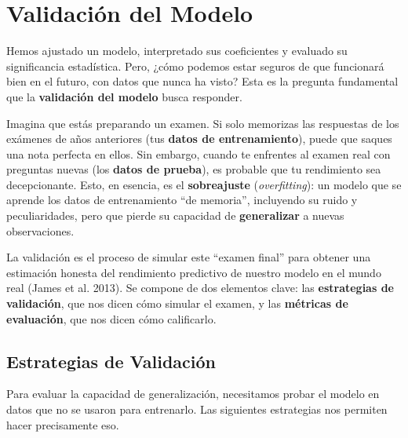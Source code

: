 \documentclass[
  letterpaper,
  DIV=11,
  numbers=noendperiod]{scrreprt}
\begin{document}
\section{Validación del Modelo}\label{validaciuxf3n-del-modelo}

Hemos ajustado un modelo, interpretado sus coeficientes y evaluado su
significancia estadística. Pero, ¿cómo podemos estar seguros de que
funcionará bien en el futuro, con datos que nunca ha visto? Esta es la
pregunta fundamental que la \textbf{validación del modelo} busca
responder.

Imagina que estás preparando un examen. Si solo memorizas las respuestas
de los exámenes de años anteriores (tus \textbf{datos de
entrenamiento}), puede que saques una nota perfecta en ellos. Sin
embargo, cuando te enfrentes al examen real con preguntas nuevas (los
\textbf{datos de prueba}), es probable que tu rendimiento sea
decepcionante. Esto, en esencia, es el \textbf{sobreajuste}
(\emph{overfitting}): un modelo que se aprende los datos de
entrenamiento ``de memoria'', incluyendo su ruido y peculiaridades, pero
que pierde su capacidad de \textbf{generalizar} a nuevas observaciones.

La validación es el proceso de simular este ``examen final'' para
obtener una estimación honesta del rendimiento predictivo de nuestro
modelo en el mundo real (James et al. 2013). Se compone de dos elementos
clave: las \textbf{estrategias de validación}, que nos dicen cómo
simular el examen, y las \textbf{métricas de evaluación}, que nos dicen
cómo calificarlo.

\subsection{Estrategias de
Validación}\label{estrategias-de-validaciuxf3n}

Para evaluar la capacidad de generalización, necesitamos probar el
modelo en datos que no se usaron para entrenarlo. Las siguientes
estrategias nos permiten hacer precisamente eso.
\end{document}
